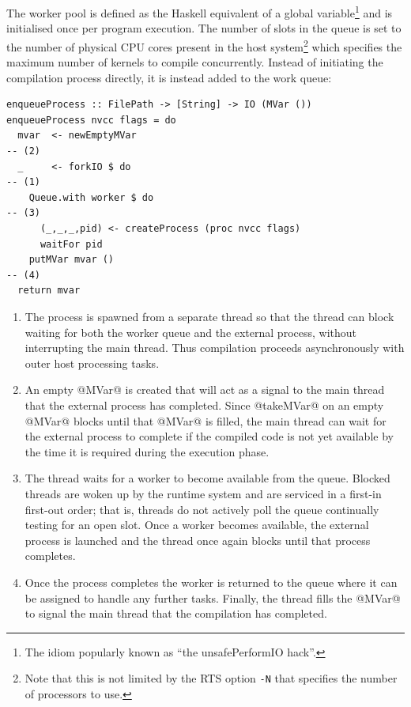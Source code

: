 The worker pool is defined as the Haskell equivalent of a global
variable\footnote{The idiom popularly known as ``the unsafePerformIO hack''.}
and is initialised once per program execution. The number of slots in the queue
is set to the number of physical CPU cores present in the host
system\footnote{Note that this is not limited by the RTS option \texttt{-N} that
specifies the number of processors to use.} which specifies the maximum number
of kernels to compile concurrently. Instead of initiating the compilation
process directly, it is instead added to the work queue:
%
\begin{lstlisting}[style=haskell,firstnumber=last]
enqueueProcess :: FilePath -> [String] -> IO (MVar ())
enqueueProcess nvcc flags = do
  mvar  <- newEmptyMVar                                                            -- (2)
  _     <- forkIO $ do                                                             -- (1)
    Queue.with worker $ do                                                         -- (3)
      (_,_,_,pid) <- createProcess (proc nvcc flags)
      waitFor pid
    putMVar mvar ()                                                                -- (4)
  return mvar
\end{lstlisting}
%
\begin{enumerate}
\item The process is spawned from a separate thread so that the thread can block
    waiting for both the worker queue and the external process, without
    interrupting the main thread. Thus compilation proceeds asynchronously with
    outer host processing tasks.

\item An empty @MVar@ is created that will act as a signal to the main
    thread that the external process has completed. Since @takeMVar@ on an
    empty @MVar@ blocks until that @MVar@ is filled, the main thread
    can wait for the external process to complete if the compiled code is not
    yet available by the time it is required during the execution phase.

\item The thread waits for a worker to become available from the queue. Blocked
    threads are woken up by the runtime system and are serviced in a first-in
    first-out order; that is, threads do not actively poll the queue continually
    testing for an open slot. Once a worker becomes available, the external
    process is launched and the thread once again blocks until that process
    completes.

\item Once the process completes the worker is returned to the queue where it
    can be assigned to handle any further tasks. Finally, the thread fills the
    @MVar@ to signal the main thread that the compilation has completed.
\end{enumerate}

